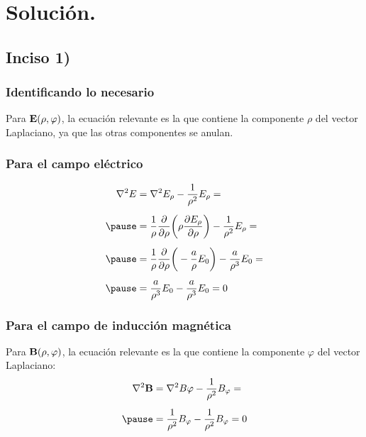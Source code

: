 \documentclass[12pt]{beamer}
\begin{document}
\section{Solución.}
\subsection{Inciso 1)}

\begin{frame}
\frametitle{Identificando lo necesario}
Para $\vb{E} (\rho, \varphi)$, la ecuación relevante es la que contiene la componente $\rho$ del vector Laplaciano, ya que las otras componentes se anulan.
\end{frame}
\begin{frame}
\frametitle{Para el campo eléctrico}
\begin{eqnarray*}
\begin{aligned}
\laplacian{E} &= \laplacian{E_{\rho}} - \dfrac{1}{\rho^{2}} E_{\rho} = \\[0.5em] \pause
&= \dfrac{1}{\rho} \pdv{\rho} \bigg( \rho \pdv{E_{\rho}}{\rho} \bigg) - \dfrac{1}{\rho^{2}} E_{\rho} = \\[0.5em] \pause
&= \dfrac{1}{\rho} \pdv{\rho} \bigg( - \dfrac{a}{\rho} E_{0} \bigg) - \dfrac{a}{\rho^{3}} E_{0} = \\[0.5em] \pause
&= \dfrac{a}{\rho^{3}} E_{0} - \dfrac{a}{\rho^{3}} E_{0} = 0
\end{aligned}
\end{eqnarray*}
\end{frame}
\begin{frame}
\frametitle{Para el campo de inducción magnética}
Para $\vb{B} (\rho, \varphi)$, la ecuación relevante es la que contiene la componente $\varphi$ del vector Laplaciano:
\pause
\begin{eqnarray*}
\begin{aligned}
\laplacian{\vb{B}} &= \laplacian{B_{}\varphi} - \dfrac{1}{\rho^{2}} B_{\varphi} = \\[0.5em] \pause
&= \dfrac{1}{\rho^{2}} B_{\varphi} - \dfrac{1}{\rho^{2}} B_{\varphi} = 0
\end{aligned}
\end{eqnarray*}
\end{frame}
\end{document}
